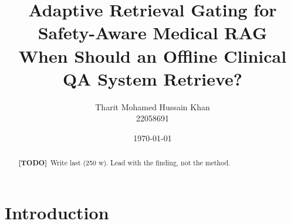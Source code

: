 \documentclass[11pt,a4paper]{report}
\title{Adaptive Retrieval Gating for Safety-Aware Medical RAG\\
       \large When Should an Offline Clinical QA System Retrieve?}
\author{Tharit Mohamed Hussain Khan\\\small 22058691}
\date{\today}
\newcommand{\todo}[1]{\par\noindent\textcolor{red!70!black}{\small\textbf{[TODO]}~#1}\par}
\begin{document}
\maketitle

\begin{abstract}
\todo{Write last (250 w). Lead with the finding, not the method.}
\end{abstract}

\tableofcontents
\listoffigures
\listoftables

\clearpage
{}

\chapter{Introduction}
\label{ch:intro}
\end{document}
